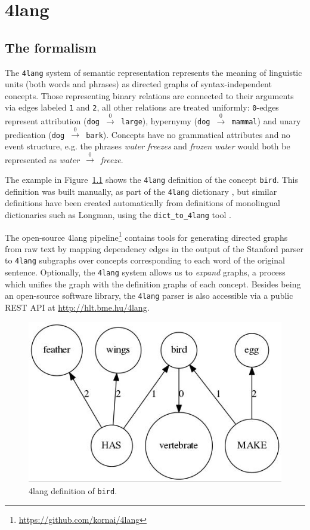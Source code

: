 \chapter{4lang}
\label{chap:4lang}
\section{The formalism}
The \texttt{4lang} system of semantic representation \cite{Kornai:2015a}
represents the meaning of linguistic units (both words and phrases)
as directed graphs of syntax-independent concepts.
Those representing binary relations are connected to their arguments
via edges labeled \texttt{1} and \texttt{2}, all other relations are treated
uniformly: \texttt{0}-edges represent attribution (\texttt{dog
	$\xrightarrow0$ large}), hypernymy (\texttt{dog $\xrightarrow0$ mammal}) and unary predication
(\texttt{dog  $\xrightarrow0$ bark}).
Concepts have no grammatical attributes and no event structure, e.g.
the phrases \textit{water freezes} and \textit{frozen water} would both be
represented as \textit{water}~$\xrightarrow0$~\textit{freeze}. 

The example in
Figure~\ref{fig:bird} shows the \texttt{4lang} definition of the
concept \texttt{bird}. This definition was built manually, as part of
the \texttt{4lang} dictionary \cite{Kornai:2013}, but similar
definitions have been created automatically from definitions of
monolingual dictionaries such as Longman, using the
\texttt{dict\_to\_4lang} tool \cite{Recski:2016d}.

The open-source 4lang pipeline\footnote{\url{https://github.com/kornai/4lang}}
contains tools for generating
directed graphs from raw text by mapping dependency edges in the output of the
Stanford parser \cite{deMarneffe:2006} to \texttt{4lang} subgraphs over
concepts corresponding to each word of the original sentence.
Optionally, the \texttt{4lang} system allows us to \textit{expand}
graphs, a process which unifies the graph with the definition graphs of
each concept. 
Besides being an open-source software library,
the \texttt{4lang} parser is also accessible via a public
REST API at \url{http://hlt.bme.hu/4lang}.

\begin{figure}[!htb]
	\centering
	\includegraphics[scale=0.5]{figures/bird}
	\caption{4lang definition of \texttt{bird}.}
	\label{fig:bird}
\end{figure}

